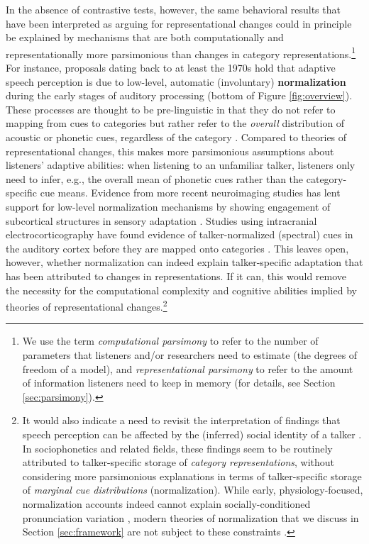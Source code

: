 \documentclass[
  11pt,
  man,floatsintext]{apa6}
\begin{document}
In the absence of contrastive tests, however, the same behavioral results that have been interpreted as arguing for representational changes could in principle be explained by mechanisms that are both computationally and representationally more parsimonious than changes in category representations.\footnote{We use the term \emph{computational parsimony} to refer to the number of parameters that listeners and/or researchers need to estimate (the degrees of freedom of a model), and \emph{representational parsimony} to refer to the amount of information listeners need to keep in memory (for details, see Section \ref{sec:parsimony}).} For instance, proposals dating back to at least the 1970s hold that adaptive speech perception is due to low-level, automatic (involuntary) \textbf{normalization} during the early stages of auditory processing (bottom of Figure \ref{fig:overview}). These processes are thought to be pre-linguistic in that they do not refer to mapping from cues to categories but rather refer to the \emph{overall} distribution of acoustic or phonetic cues, regardless of the category \autocites[for reviews,][]{johnson-sjerps2021,stilp2020}. Compared to theories of representational changes, this makes more parsimonious assumptions about listeners' adaptive abilities: when listening to an unfamiliar talker, listeners only need to infer, e.g., the overall mean of phonetic cues rather than the category-specific cue means. Evidence from more recent neuroimaging studies has lent support for low-level normalization mechanisms by showing engagement of subcortical structures in sensory adaptation \autocites[e.g., the brain stem,][]{skoe2021auditory}[and cerebellum,][]{guediche2015evidence}[for review, see][]{guediche2014}. Studies using intracranial electrocorticography have found evidence of talker-normalized (spectral) cues in the auditory cortex before they are mapped onto categories \autocites[e.g.,][]{sjerps2019,Tang2017}. This leaves open, however, whether normalization can indeed explain talker-specific adaptation that has been attributed to changes in representations. If it can, this would remove the necessity for the computational complexity and cognitive abilities implied by theories of representational changes.\footnote{It would also indicate a need to revisit the interpretation of findings that speech perception can be affected by the (inferred) social identity of a talker \autocites[e.g., regional origin,][]{hay-drager2010,niedzielski1999}[sex,][]{johnson1999,strand1999}[age,][]{skoogwaller2015,walker-hay2011}[and individual identity,][]{nygaard1994,remez2018}. In sociophonetics and related fields, these findings seem to be routinely attributed to talker-specific storage of \emph{category representations}, without considering more parsimonious explanations in terms of talker-specific storage of \emph{marginal cue distributions} (normalization). While early, physiology-focused, normalization accounts indeed cannot explain socially-conditioned pronunciation variation \autocite[see, e.g.,][]{johnson2006}, modern theories of normalization that we discuss in Section \ref{sec:framework} are not subject to these constraints \autocites[see also][]{magnuson-nusbaum2007,pisoni1997}.}
\end{document}
